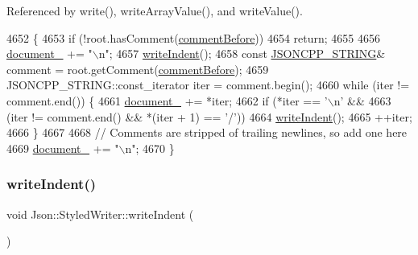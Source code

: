 Referenced by write(), write\+Array\+Value(), and write\+Value().


\begin{DoxyCode}
4652                                                             \{
4653   \textcolor{keywordflow}{if} (!root.hasComment(\hyperlink{namespace_json_a4fc417c23905b2ae9e2c47d197a45351a52f1733775460517b2ea6bedf4906d52}{commentBefore}))
4654     \textcolor{keywordflow}{return};
4655 
4656   \hyperlink{class_json_1_1_styled_writer_ae967b0c77e4d7cb889ce7b6ee4ce28d7}{document\_} += \textcolor{stringliteral}{"\(\backslash\)n"};
4657   \hyperlink{class_json_1_1_styled_writer_a885f4bfb5701896d60eee6716d2db7e4}{writeIndent}();
4658   \textcolor{keyword}{const} \hyperlink{json_8h_a1e723f95759de062585bc4a8fd3fa4be}{JSONCPP\_STRING}& comment = root.getComment(\hyperlink{namespace_json_a4fc417c23905b2ae9e2c47d197a45351a52f1733775460517b2ea6bedf4906d52}{commentBefore});
4659   JSONCPP\_STRING::const\_iterator iter = comment.begin();
4660   \textcolor{keywordflow}{while} (iter != comment.end()) \{
4661     \hyperlink{class_json_1_1_styled_writer_ae967b0c77e4d7cb889ce7b6ee4ce28d7}{document\_} += *iter;
4662     \textcolor{keywordflow}{if} (*iter == \textcolor{charliteral}{'\(\backslash\)n'} &&
4663        (iter != comment.end() && *(iter + 1) == \textcolor{charliteral}{'/'}))
4664       \hyperlink{class_json_1_1_styled_writer_a885f4bfb5701896d60eee6716d2db7e4}{writeIndent}();
4665     ++iter;
4666   \}
4667 
4668   \textcolor{comment}{// Comments are stripped of trailing newlines, so add one here}
4669   \hyperlink{class_json_1_1_styled_writer_ae967b0c77e4d7cb889ce7b6ee4ce28d7}{document\_} += \textcolor{stringliteral}{"\(\backslash\)n"};
4670 \}
\end{DoxyCode}
\mbox{\label{class_json_1_1_styled_writer_a885f4bfb5701896d60eee6716d2db7e4}} 
\subsubsection{\texorpdfstring{write\+Indent()}{writeIndent()}}
{\footnotesize\ttfamily void Json\+::\+Styled\+Writer\+::write\+Indent (\begin{DoxyParamCaption}{ }\end{DoxyParamCaption})\hspace{0.3cm}{\ttfamily [private]}}



